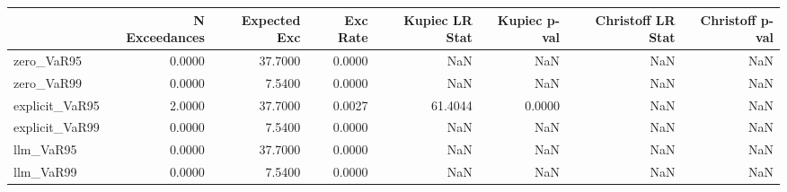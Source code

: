\begin{tabular}{lrrrrrrr}
\toprule
 & N Exceedances & Expected Exc & Exc Rate & Kupiec LR Stat & Kupiec p-val & Christoff LR Stat & Christoff p-val \\
\midrule
zero_VaR95 & 0.0000 & 37.7000 & 0.0000 & NaN & NaN & NaN & NaN \\
zero_VaR99 & 0.0000 & 7.5400 & 0.0000 & NaN & NaN & NaN & NaN \\
explicit_VaR95 & 2.0000 & 37.7000 & 0.0027 & 61.4044 & 0.0000 & NaN & NaN \\
explicit_VaR99 & 0.0000 & 7.5400 & 0.0000 & NaN & NaN & NaN & NaN \\
llm_VaR95 & 0.0000 & 37.7000 & 0.0000 & NaN & NaN & NaN & NaN \\
llm_VaR99 & 0.0000 & 7.5400 & 0.0000 & NaN & NaN & NaN & NaN \\
\bottomrule
\end{tabular}
